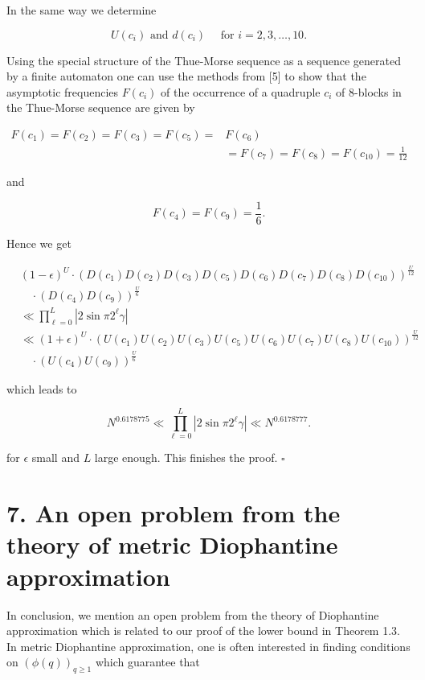 \documentclass[10pt]{article}
\begin{document}
In the same way we determine

$$
U\left(c_{i}\right) \text { and } d\left(c_{i}\right) \quad \text { for } i=2,3, \ldots, 10 .
$$

Using the special structure of the Thue-Morse sequence as a sequence generated by a finite automaton one can use the methods from [5] to show that the asymptotic frequencies $F\left(c_{i}\right)$ of the occurrence of a quadruple $c_{i}$ of 8-blocks in the Thue-Morse sequence are given by

$$
\begin{aligned}
F\left(c_{1}\right)=F\left(c_{2}\right)=F\left(c_{3}\right)=F\left(c_{5}\right)= & F\left(c_{6}\right) \\
& =F\left(c_{7}\right)=F\left(c_{8}\right)=F\left(c_{10}\right)=\frac{1}{12}
\end{aligned}
$$

and

$$
F\left(c_{4}\right)=F\left(c_{9}\right)=\frac{1}{6} .
$$

Hence we get

$$
\begin{aligned}
& (1-\epsilon)^{U} \cdot\left(D\left(c_{1}\right) D\left(c_{2}\right) D\left(c_{3}\right) D\left(c_{5}\right) D\left(c_{6}\right) D\left(c_{7}\right) D\left(c_{8}\right) D\left(c_{10}\right)\right)^{\frac{U}{12}} \\
& \quad \cdot\left(D\left(c_{4}\right) D\left(c_{9}\right)\right)^{\frac{U}{6}} \\
& \ll \prod_{\ell=0}^{L}\left|2 \sin \pi 2^{\ell} \gamma\right| \\
& \ll(1+\epsilon)^{U} \cdot\left(U\left(c_{1}\right) U\left(c_{2}\right) U\left(c_{3}\right) U\left(c_{5}\right) U\left(c_{6}\right) U\left(c_{7}\right) U\left(c_{8}\right) U\left(c_{10}\right)\right)^{\frac{U}{12}} \\
& \quad \cdot\left(U\left(c_{4}\right) U\left(c_{9}\right)\right)^{\frac{U}{6}}
\end{aligned}
$$

which leads to

$$
N^{0.6178775} \ll \prod_{\ell=0}^{L}\left|2 \sin \pi 2^{\ell} \gamma\right| \ll N^{0.6178777} .
$$

for $\epsilon$ small and $L$ large enough. This finishes the proof. \(\square\)

\section*{7. An open problem from the theory of metric Diophantine approximation}
In conclusion, we mention an open problem from the theory of Diophantine approximation which is related to our proof of the lower bound in Theorem 1.3. In metric Diophantine approximation, one is often interested in finding conditions on $(\phi(q))_{q \geqslant 1}$ which guarantee that
\end{document}
